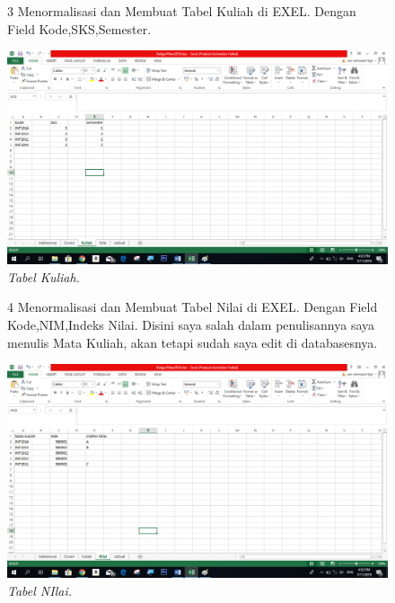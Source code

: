 \begin{enumerate}
\begin{figure}
\item[3]Menormalisasi dan Membuat Tabel Kuliah di EXEL. Dengan Field Kode,SKS,Semester.

    \begin{center}
    \includegraphics[scale=0.4]{figures/3.png}
    \caption{\textit{Tabel Kuliah.}}
    \end{center}
    \label{gambar}
    \end{figure}

\begin{figure}
\item[4]Menormalisasi dan Membuat Tabel Nilai di EXEL. Dengan Field Kode,NIM,Indeks Nilai. Disini saya salah dalam penulisannya saya menulis Mata Kuliah, akan tetapi sudah saya edit di databasesnya. 

    \begin{center}
    \includegraphics[scale=0.4]{figures/4.png}
    \caption{\textit{Tabel NIlai.}}
    \end{center}
    \label{gambar}
    \end{figure}


\end{enumerate}
